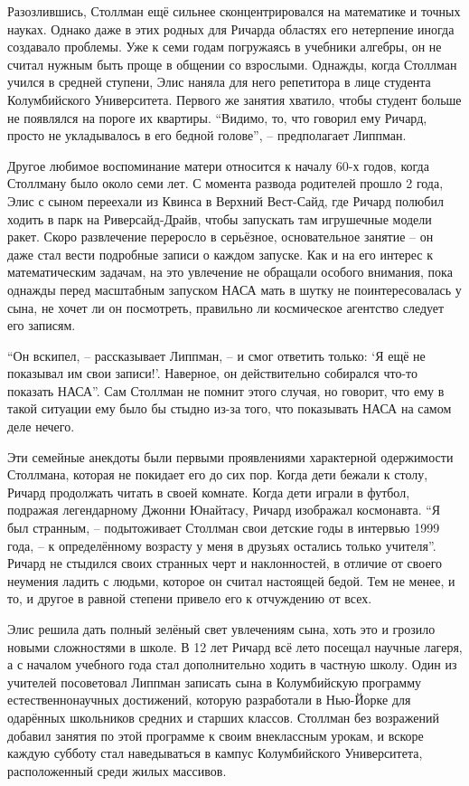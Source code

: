 Разозлившись, Столлман ещё сильнее сконцентрировался на математике и точных науках. Однако даже в этих родных для Ричарда областях его нетерпение иногда создавало проблемы. Уже к семи годам погружаясь в учебники алгебры, он не считал нужным быть проще в общении со взрослыми. Однажды, когда Столлман учился в средней ступени, Элис наняла для него репетитора в лице студента Колумбийского Университета. Первого же занятия хватило, чтобы студент больше не появлялся на пороге их квартиры. \enquote{Видимо, то, что говорил ему Ричард, просто не укладывалось в его бедной голове}, -- предполагает Липпман.

Другое любимое воспоминание матери относится к началу 60-х годов, когда Столлману было около семи лет. С момента развода родителей прошло 2 года, Элис с сыном переехали из Квинса в Верхний Вест-Сайд, где Ричард полюбил ходить в парк на Риверсайд-Драйв, чтобы запускать там игрушечные модели ракет. Скоро развлечение переросло в серьёзное, основательное занятие -- он даже стал вести подробные записи о каждом запуске. Как и на его интерес к математическим задачам, на это увлечение не обращали особого внимания, пока однажды перед масштабным запуском НАСА мать в шутку не поинтересовалась у сына, не хочет ли он посмотреть, правильно ли космическое агентство следует его записям.

\enquote{Он вскипел, -- рассказывает Липпман, -- и смог ответить только: \enquote{Я ещё не показывал им свои записи!}. Наверное, он действительно собирался что-то показать НАСА}. Сам Столлман не помнит этого случая, но говорит, что ему в такой ситуации ему было бы стыдно из-за того, что показывать НАСА на самом деле нечего.

Эти семейные анекдоты были первыми проявлениями характерной одержимости Столлмана, которая не покидает его до сих пор. Когда дети бежали к столу, Ричард продолжать читать в своей комнате. Когда дети играли в футбол, подражая легендарному Джонни Юнайтасу, Ричард изображал космонавта. \enquote{Я был странным, -- подытоживает Столлман свои детские годы в интервью 1999 года, -- к определённому возрасту у меня в друзьях остались только учителя}. Ричард не стыдился своих странных черт и наклонностей, в отличие от своего неумения ладить с людьми, которое он считал настоящей бедой. Тем не менее, и то, и другое в равной степени привело его к отчуждению от всех.

Элис решила дать полный зелёный свет увлечениям сына, хоть это и грозило новыми сложностями в школе. В 12 лет Ричард всё лето посещал научные лагеря, а с началом учебного года стал дополнительно ходить в частную школу. Один из учителей посоветовал Липпман записать сына в Колумбийскую программу естественнонаучных достижений, которую разработали в Нью-Йорке для одарённых школьников средних и старших классов. Столлман без возражений добавил занятия по этой программе к своим внеклассным урокам, и вскоре каждую субботу стал наведываться в кампус Колумбийского Университета, расположенный среди жилых массивов.

